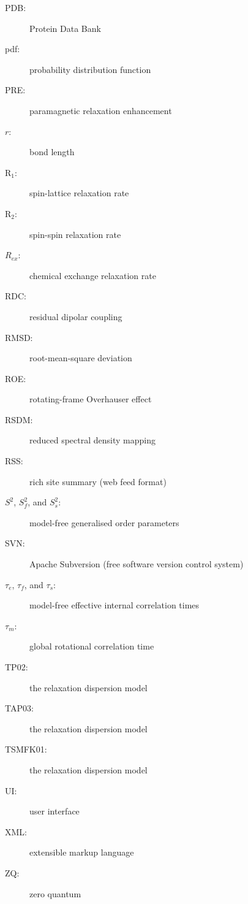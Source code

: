 \documentclass[a4paper, 11pt, twoside, openright]{book}
\newenvironment{spacedpara}{\setlength{\parindent}{0pt} \setlength{\parskip}{2ex plus 0.5ex minus 0.2ex}}{}
\newcommand{\Rone}{\mathrm{R}_1}
\newcommand{\Rtwo}{\mathrm{R}_2}
\begin{document}
\begin{description}
  \item[PDB:]  Protein Data Bank
  \item[pdf:]  probability distribution function
  \item[PRE:]  paramagnetic relaxation enhancement
  \item[$r$:]  bond length
  \item[$\Rone$:]  spin-lattice relaxation rate
  \item[$\Rtwo$:]  spin-spin relaxation rate
  \item[$R_{ex}$:]  chemical exchange relaxation rate
  \item[RDC:]  residual dipolar coupling
  \item[RMSD:]  root-mean-square deviation
  \item[ROE:]  rotating-frame Overhauser effect
  \item[RSDM:]  reduced spectral density mapping
  \item[RSS:]  rich site summary (web feed format)
  \item[$S^2$, $S^2_f$, and $S^2_s$:]  model-free generalised order parameters
  \item[SVN:]  Apache Subversion (free software version control system)
  \item[$\tau_e$, $\tau_f$, and $\tau_s$:]  model-free effective internal correlation times
  \item[$\tau_m$:]  global rotational correlation time
  \item[TP02:]  the \citet{TrottPalmer02} relaxation dispersion model
  \item[TAP03:]  the \citet{Trott03} relaxation dispersion model
  \item[TSMFK01:]  the \citet{Tollinger01} relaxation dispersion model
  \item[UI:]  user interface
  \item[XML:]  extensible markup language
  \item[ZQ:]  zero quantum
\end{description}

\begin{htmlonly}
\addtocounter{chapter}{-1}
\end{htmlonly}



\begin{spacedpara}

\end{spacedpara}
\end{document}
